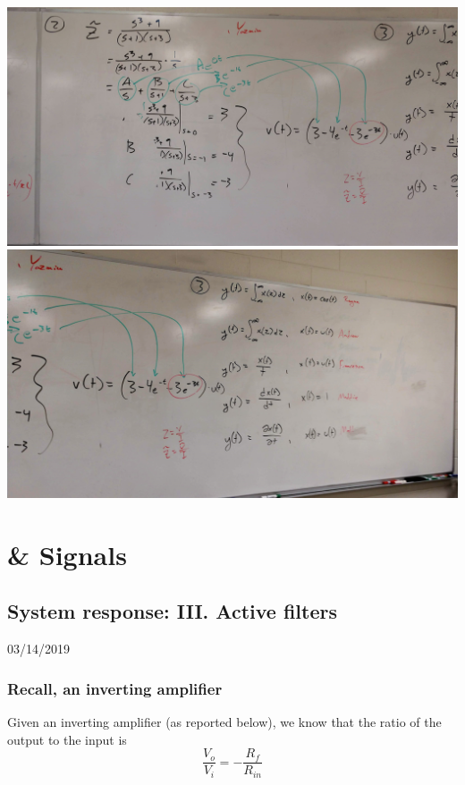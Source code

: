 \documentclass[11pt]{book}
\begin{document}
\\
\includegraphics[width=\textwidth]{figures/3-12-19_Fig.5.jpg}
\\
\includegraphics[width=\textwidth]{figures/3-12-19_Fig.6.jpg}


\part{\& Signals}



\chapter{System response: III. Active filters}
03/14/2019 

\section{Recall, an inverting amplifier}
Given an inverting amplifier (as reported below), we know that the ratio of the output to the input is
\begin{equation}
	\frac{V_o}{V_i} = -\frac{R_f}{R_{in}}
\end{equation}
\end{document}

